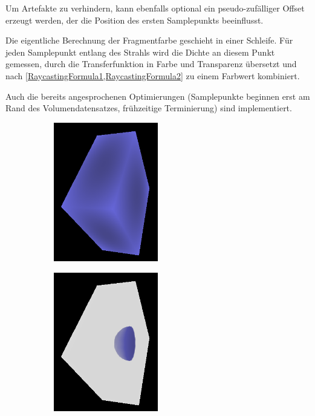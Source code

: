\documentclass[a4paper,fontsize=12pt,toc=bib,halfparskip,ngerman]{scrartcl}
\begin{document}
Um Artefakte zu verhindern, kann ebenfalls optional ein pseudo-zuf\"alliger Offset erzeugt werden, der die Position des ersten Samplepunkts beeinflusst.

Die eigentliche Berechnung der Fragmentfarbe geschieht in einer Schleife. F\"ur jeden Samplepunkt entlang des Strahls wird die Dichte an diesem Punkt gemessen, durch die Transferfunktion in Farbe und Transparenz  \"ubersetzt und nach \cref{RaycastingFormula1,RaycastingFormula2} zu einem Farbwert kombiniert. 

Auch die bereits angesprochenen Optimierungen (Samplepunkte beginnen erst am Rand des Volumendatensatzes, fr\"uhzeitige Terminierung) sind implementiert.

\begin{figure}
	\hspace*{\fill}
	\begin{subfigure}{0.49\textwidth}
		\centering
		\includegraphics[width=0.5\textwidth]{pictures/Raycasting1.png}
		\subcaption{}
		\label{RaycastingExample1}
	\end{subfigure}
	\hfill
	\begin{subfigure}{0.49\textwidth}
		\centering
		\includegraphics[width=0.5\textwidth]{pictures/Raycasting2.png}

\end{subfigure}
\end{figure}
\end{document}

